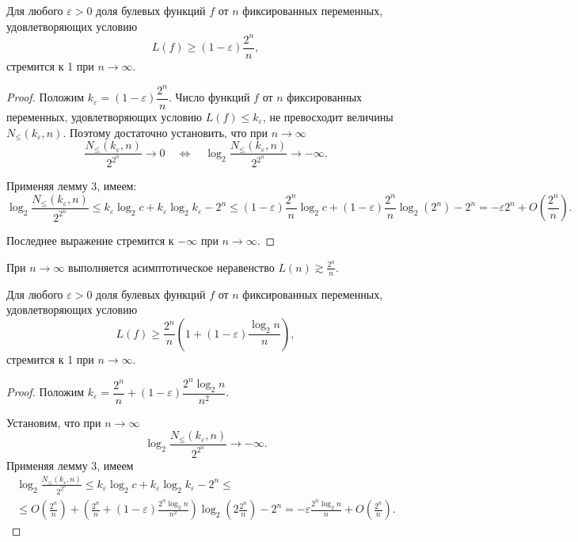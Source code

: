 \begin{theorem}
    Для любого $\varepsilon > 0$ доля булевых функций $f$ от $n$ фиксированных переменных, удовлетворяющих условию \[L(f) \geqslant (1-\varepsilon) \dfrac{2^n}{n},\] стремится к 1 при $n\to \infty$.
\end{theorem}

\begin{proof}
    Положим $k_{\varepsilon} = (1-\varepsilon) \dfrac{2^n}{n}$. Число функций $f$ от $n$ фиксированных переменных, удовлетворяющих условию $L(f) \leqslant k_{\varepsilon}$, не превосходит величины $N_{\leqslant}(k_{\varepsilon}, n)$. Поэтому достаточно установить, что при $n \to \infty$
    \[
        \frac{N_{\leqslant}(k_{\varepsilon}, n)}{2^{2^n}} \to 0 \quad \Longleftrightarrow \quad \log_2 \frac{N_{\leqslant}(k_{\varepsilon}, n)}{2^{2^n}} \to -\infty.
    \]
    
    Применяя лемму 3, имеем:
    \[
        \log_2 \frac{N_{\leqslant}(k_{\varepsilon}, n)}{2^{2^n}} \leqslant k_{\varepsilon}\log_2 c + k_{\varepsilon} \log_2 k_{\varepsilon} - 2^n \leqslant (1-\varepsilon) \frac{2^n}{n} \log_2 c + (1-\varepsilon) \frac{2^n}{n}\log_2 (2^n) - 2^n = -\varepsilon 2^n + O\left(\frac{2^n}{n}\right).
    \]
    
    Последнее выражение стремится к $-\infty$ при $n \to \infty$.
\end{proof}

\begin{corollary}
    При $n \to \infty$ выполняется асимптотическое неравенство $L(n) \gtrsim \frac{2^n}{n}$.
\end{corollary}

\begin{theorem}
    Для любого $\varepsilon > 0$ доля булевых функций $f$ от $n$ фиксированных переменных, удовлетворяющих условию
    \[
        L(f) \geqslant \frac{2^n}{n}\left(1+(1-\varepsilon)\frac{\log_2 n}{n}\right),
    \]
    стремится к 1 при $n\to \infty$.
\end{theorem}

\begin{proof}
    Положим $k_\varepsilon = \dfrac{2^n}{n}+(1-\varepsilon)\dfrac{2^n\log_2 n}{n^2}$.

    Установим, что при $n \to \infty$
    \[
        \log_2 \frac{N_{\leqslant}(k_\varepsilon, n)}{2^{2^n}} \to -\infty.
    \]
    Применяя лемму 3, имеем
    \begin{multline*}
        \log_2 \frac{N_{\leqslant}(k_\varepsilon, n)}{2^{2^n}} \leqslant k_{\varepsilon}\log_2 c + k_{\varepsilon} \log_2 k_{\varepsilon} - 2^n \leqslant \\ \leqslant O\left(\frac{2^n}{n}\right) + \left(\frac{2^n}{n}+(1-\varepsilon)\frac{2^n\log_2 n}{n^2}\right) \log_2\left(2 \frac{2^n}{n}\right) - 2^n = -\varepsilon \frac{2^n\log_2 n}{n} + O\left(\frac{2^n}{n}\right).
    \end{multline*}
\end{proof}